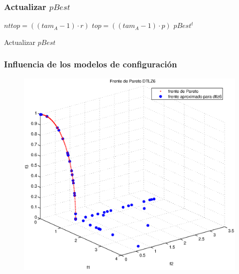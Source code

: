 \documentclass[10pt,compress]{beamer}
\begin{document}
\begin{frame}
	\frametitle{Actualizar $pBest$}	
	\begin{algorithm}[H]
		$nttop = ((tam_A - 1) \cdot r)$\;
		$top = ((tam_A - 1) \cdot p)$\;
	\Return $pBest^t$\;	
	\caption{Actualizar $pBest$}
	\end{algorithm}
\end{frame}
\begin{frame}
	\frametitle{Influencia de los modelos de configuraci\'on}	
	\begin{figure}[H]
	\centering
	\includegraphics[scale=0.45]{idtlz6.eps}
     
      \end{figure}
\end{frame}
\end{document}
